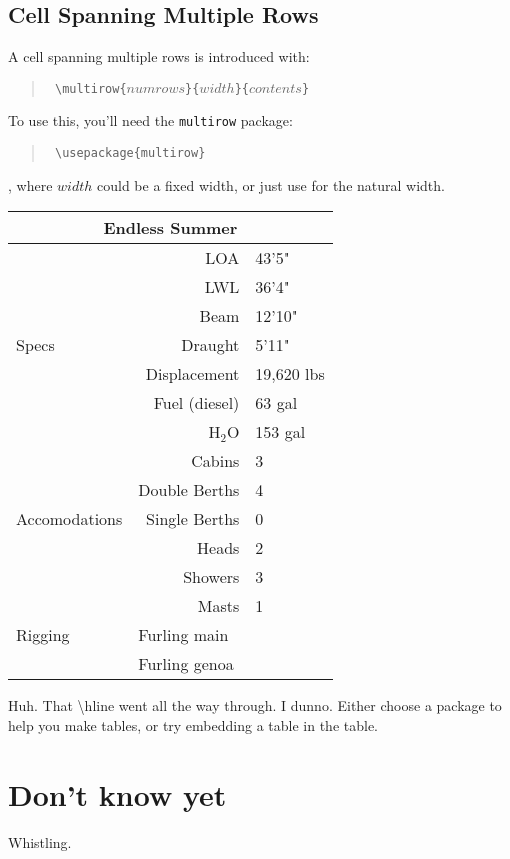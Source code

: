 \subsection{Cell Spanning Multiple Rows}

A cell spanning multiple rows is introduced with:

\begin{quote}
	\texttt{ \textbackslash{}multirow\{$numrows$\}\{$width$\}\{$contents$\} }
\end{quote}

To use this, you'll need the \texttt{multirow} package:

\begin{quote}
	\texttt{ \textbackslash{}usepackage\{multirow\} }
\end{quote}


, where $width$ could be a fixed width, or just use \* for the natural
width.

\begin{center}
	\begin{tabular}{|l|r|l|}
		\hline
		\multicolumn{3}{|c|}{Endless Summer} \\
		\hline
		\multirow{7}{*}{Specs}
			& LOA & 43'5" \\
			& LWL & 36'4" \\
			& Beam & 12'10" \\
			& Draught & 5'11" \\
			& Displacement & 19,620 lbs \\
			& Fuel (diesel) & 63 gal \\
			& H$_2$O & 153 gal \\
			\hline
		\multirow{5}{*}{Accomodations}
			& Cabins & 3 \\
			& Double Berths & 4 \\
			& Single Berths & 0 \\
			& Heads & 2 \\
			& Showers & 3 \\
			\hline
		\multirow{3}{*}{Rigging}
			& Masts & 1 \\
			\hline
			& \multicolumn{2}{|l|}{Furling main} \\
			& \multicolumn{2}{|l|}{Furling genoa} \\
			\hline
	\end{tabular}
\end{center}

Huh.  That \textbackslash{}hline went all the way through. I dunno.  Either
choose a package to help you make tables, or try embedding a table in the
table.

\section{Don't know yet}
\label{hold}

Whistling.
